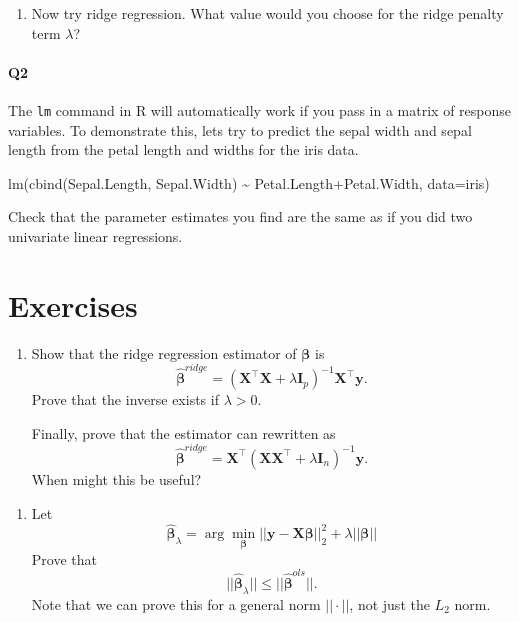 \documentclass[
]{book}
\newenvironment{Shaded}{\begin{snugshade}}{\end{snugshade}}
\newcommand{\AttributeTok}[1]{\textcolor[rgb]{0.77,0.63,0.00}{#1}}
\newcommand{\FunctionTok}[1]{\textcolor[rgb]{0.00,0.00,0.00}{#1}}
\newcommand{\NormalTok}[1]{#1}
\newcommand{\SpecialCharTok}[1]{\textcolor[rgb]{0.00,0.00,0.00}{#1}}
\providecommand{\tightlist}{%
  \setlength{\itemsep}{0pt}\setlength{\parskip}{0pt}}
\theoremstyle{definition}
\theoremstyle{definition}
\theoremstyle{definition}
\theoremstyle{definition}
\theoremstyle{remark}
\begin{document}
\begin{enumerate}
\def\labelenumi{\roman{enumi}.}
\setcounter{enumi}{3}
\tightlist
\item
  Now try ridge regression. What value would you choose for the ridge penalty term \(\lambda\)?
\end{enumerate}

\hypertarget{q2-1}{%
\paragraph*{Q2}\label{q2-1}}

The \texttt{lm} command in R will automatically work if you pass in a matrix of response variables. To demonstrate this, lets try to predict the sepal width and sepal length from the petal length and widths for the iris data.

\begin{Shaded}
\begin{Highlighting}[]
\FunctionTok{lm}\NormalTok{(}\FunctionTok{cbind}\NormalTok{(Sepal.Length, Sepal.Width) }\SpecialCharTok{\textasciitilde{}}\NormalTok{ Petal.Length}\SpecialCharTok{+}\NormalTok{Petal.Width,}
   \AttributeTok{data=}\NormalTok{iris)}
\end{Highlighting}
\end{Shaded}

Check that the parameter estimates you find are the same as if you did two univariate linear regressions.

\hypertarget{exercises-7}{%
\section{Exercises}\label{exercises-7}}

\begin{enumerate}
\def\labelenumi{\arabic{enumi}.}
\item
  Show that the ridge regression estimator of \(\boldsymbol \beta\) is
  \[\hat{\boldsymbol \beta}^{ridge} = (\mathbf X^\top \mathbf X+ \lambda\mathbf I_p)^{-1}\mathbf X^\top \mathbf y.\]
  Prove that the inverse exists if \(\lambda > 0\).

  Finally, prove that the estimator can rewritten as
  \[\hat{\boldsymbol \beta}^{ridge} = \mathbf X^\top(\mathbf X\mathbf X^\top + \lambda\mathbf I_n)^{-1} \mathbf y.\]
  When might this be useful?
\end{enumerate}

\begin{enumerate}
\def\labelenumi{\arabic{enumi}.}
\setcounter{enumi}{1}
\tightlist
\item
  Let
  \[\hat{\boldsymbol \beta}_\lambda=\arg \min_{\boldsymbol \beta} ||\mathbf y-\mathbf X\boldsymbol \beta||_2^2+\lambda ||\boldsymbol \beta||\]
  Prove that \[||\hat{\boldsymbol \beta}_\lambda|| \leq ||\hat{\boldsymbol \beta}^{ols}||.\]
  Note that we can prove this for a general norm \(||\cdot||\), not just the \(L_2\) norm.
\end{enumerate}
\end{document}
